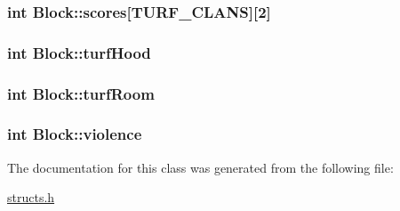 \hypertarget{classBlock_a4d1441123e6e6cc6d12184fc6e639186}{
\subsubsection[{scores}]{\setlength{\rightskip}{0pt plus 5cm}int Block\-::scores\mbox{[}{\bf T\-U\-R\-F\-\_\-\-C\-L\-A\-N\-S}\mbox{]}\mbox{[}2\mbox{]}}}\label{classBlock_a4d1441123e6e6cc6d12184fc6e639186}
\hypertarget{classBlock_a174ece7b61ffa487286bdd2fc487c510}{
\subsubsection[{turf\-Hood}]{\setlength{\rightskip}{0pt plus 5cm}int Block\-::turf\-Hood}}\label{classBlock_a174ece7b61ffa487286bdd2fc487c510}
\hypertarget{classBlock_a7d080c6c349d17e582d63405d40ba4b7}{
\subsubsection[{turf\-Room}]{\setlength{\rightskip}{0pt plus 5cm}int Block\-::turf\-Room}}\label{classBlock_a7d080c6c349d17e582d63405d40ba4b7}
\hypertarget{classBlock_ab0df0d90035b29fed825caa9f8008bab}{
\subsubsection[{violence}]{\setlength{\rightskip}{0pt plus 5cm}int Block\-::violence}}\label{classBlock_ab0df0d90035b29fed825caa9f8008bab}


The documentation for this class was generated from the following file\-:\begin{DoxyCompactItemize}
\item 
\hyperlink{structs_8h}{structs.\-h}\end{DoxyCompactItemize}
